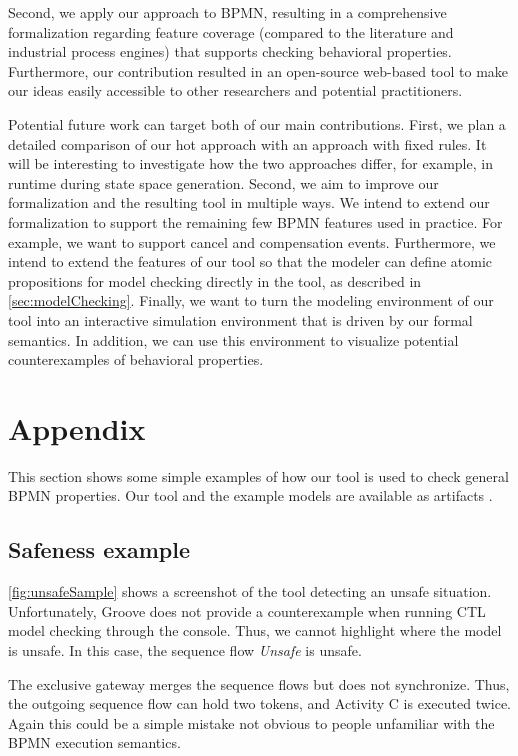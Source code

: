 \documentclass[runningheads]{llncs}
\begin{document}
Second, we apply our approach to BPMN, resulting in a comprehensive formalization regarding feature coverage (compared to the literature and industrial process engines) that supports checking behavioral properties.
Furthermore, our contribution resulted in an open-source web-based tool to make our ideas easily accessible to other researchers and potential practitioners.

Potential future work can target both of our main contributions.
First, we plan a detailed comparison of our \gls*{hot} approach with an approach with fixed rules.
It will be interesting to investigate how the two approaches differ, for example, in runtime during state space generation.
Second, we aim to improve our formalization and the resulting tool in multiple ways.
We intend to extend our formalization to support the remaining few BPMN features used in practice.
For example, we want to support cancel and compensation events.
Furthermore, we intend to extend the features of our tool so that the modeler can define atomic propositions for model checking directly in the tool, as described in \autoref{sec:modelChecking}.
Finally, we want to turn the modeling environment of our tool into an interactive simulation environment that is driven by our formal semantics.
In addition, we can use this environment to visualize potential counterexamples of behavioral properties.

 


\section{Appendix}


This section shows some simple examples of how our tool is used to check general BPMN properties.
Our tool and the example models are available as artifacts \cite{krauterArtifactsICGT2023}.

\subsection{Safeness example}
\autoref{fig:unsafeSample} shows a screenshot of the tool detecting an unsafe situation.
Unfortunately, Groove does not provide a counterexample when running CTL model checking through the console.
Thus, we cannot highlight where the model is unsafe.
In this case, the sequence flow \textit{Unsafe} is unsafe.

The exclusive gateway merges the sequence flows but does not synchronize.
Thus, the outgoing sequence flow can hold two tokens, and Activity C is executed twice.
Again this could be a simple mistake not obvious to people unfamiliar with the BPMN execution semantics.
\end{document}
